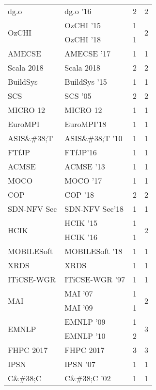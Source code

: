 \begin{table*}[t]
\begin{tabular}{llrr}
\multirow{1}{*}{dg.o } & dg.o '16 & 2 & \multirow{1}{*}{2}\\
\multirow{2}{*}{OzCHI } & OzCHI '15 & 1 & \multirow{2}{*}{2}\\
& OzCHI '18 & 1 &\\
\multirow{1}{*}{AMECSE } & AMECSE '17 & 1 & \multirow{1}{*}{1}\\
\multirow{1}{*}{Scala 2018} & Scala 2018 & 2 & \multirow{1}{*}{2}\\
\multirow{1}{*}{BuildSys } & BuildSys '15 & 1 & \multirow{1}{*}{1}\\
\multirow{1}{*}{SCS } & SCS '05 & 2 & \multirow{1}{*}{2}\\
\multirow{1}{*}{MICRO 12} & MICRO 12 & 1 & \multirow{1}{*}{1}\\
\multirow{1}{*}{EuroMPI} & EuroMPI'18 & 1 & \multirow{1}{*}{1}\\
\multirow{1}{*}{ASIS\&\#38;T } & ASIS\&\#38;T '10 & 1 & \multirow{1}{*}{1}\\
\multirow{1}{*}{FTfJP} & FTfJP'16 & 1 & \multirow{1}{*}{1}\\
\multirow{1}{*}{ACMSE } & ACMSE '13 & 1 & \multirow{1}{*}{1}\\
\multirow{1}{*}{MOCO } & MOCO '17 & 1 & \multirow{1}{*}{1}\\
\multirow{1}{*}{COP } & COP '18 & 2 & \multirow{1}{*}{2}\\
\multirow{1}{*}{SDN-NFV Sec} & SDN-NFV Sec'18 & 1 & \multirow{1}{*}{1}\\
\multirow{2}{*}{HCIK } & HCIK '15 & 1 & \multirow{2}{*}{2}\\
& HCIK '16 & 1 &\\
\multirow{1}{*}{MOBILESoft } & MOBILESoft '18 & 1 & \multirow{1}{*}{1}\\
\multirow{1}{*}{XRDS} & XRDS & 1 & \multirow{1}{*}{1}\\
\multirow{1}{*}{ITiCSE-WGR } & ITiCSE-WGR '97 & 1 & \multirow{1}{*}{1}\\
\multirow{2}{*}{MAI } & MAI '07 & 1 & \multirow{2}{*}{2}\\
& MAI '09 & 1 &\\
\multirow{2}{*}{EMNLP } & EMNLP '09 & 1 & \multirow{2}{*}{3}\\
& EMNLP '10 & 2 &\\
\multirow{1}{*}{FHPC 2017} & FHPC 2017 & 3 & \multirow{1}{*}{3}\\
\multirow{1}{*}{IPSN } & IPSN '07 & 1 & \multirow{1}{*}{1}\\
\multirow{1}{*}{C\&\#38;C } & C\&\#38;C '02 & 1 & \multirow{1}{*}{1}\\

\end{tabular}
\end{table*}
